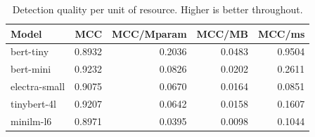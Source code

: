 \begin{table}[htbp]
\centering
\caption{Detection quality per unit of resource. Higher is better throughout.}
\label{tab:efficiency}
\small
\begin{tabular}{lrrrr}
\toprule
Model & MCC & MCC/Mparam & MCC/MB & MCC/ms \\
\midrule
bert-tiny & 0.8932 & 0.2036 & 0.0483 & 0.9504 \\
bert-mini & 0.9232 & 0.0826 & 0.0202 & 0.2611 \\
electra-small & 0.9075 & 0.0670 & 0.0164 & 0.0851 \\
tinybert-4l & 0.9207 & 0.0642 & 0.0158 & 0.1607 \\
minilm-l6 & 0.8971 & 0.0395 & 0.0098 & 0.1044 \\
\bottomrule
\end{tabular}
\end{table}
